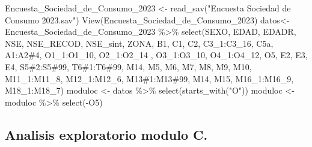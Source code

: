 \documentclass[
  letterpaper,
  DIV=11,
  numbers=noendperiod]{scrartcl}
\newenvironment{Shaded}{\begin{snugshade}}{\end{snugshade}}
\newcommand{\AttributeTok}[1]{\textcolor[rgb]{0.40,0.45,0.13}{#1}}
\newcommand{\FunctionTok}[1]{\textcolor[rgb]{0.28,0.35,0.67}{#1}}
\newcommand{\NormalTok}[1]{\textcolor[rgb]{0.00,0.23,0.31}{#1}}
\newcommand{\OtherTok}[1]{\textcolor[rgb]{0.00,0.23,0.31}{#1}}
\newcommand{\SpecialCharTok}[1]{\textcolor[rgb]{0.37,0.37,0.37}{#1}}
\newcommand{\StringTok}[1]{\textcolor[rgb]{0.13,0.47,0.30}{#1}}
\begin{document}
\begin{Shaded}
\begin{Highlighting}[]
\NormalTok{Encuesta\_Sociedad\_de\_Consumo\_2023 }\OtherTok{\textless{}{-}} \FunctionTok{read\_sav}\NormalTok{(}\StringTok{"Encuesta Sociedad de Consumo 2023.sav"}\NormalTok{)}
\FunctionTok{View}\NormalTok{(Encuesta\_Sociedad\_de\_Consumo\_2023)}
\NormalTok{datos}\OtherTok{\textless{}{-}}\NormalTok{ Encuesta\_Sociedad\_de\_Consumo\_2023 }\SpecialCharTok{\%\textgreater{}\%} \FunctionTok{select}\NormalTok{(SEXO, EDAD, EDADR, NSE, NSE\_RECOD, NSE\_sint, ZONA, B1, C1, C2, C3\_1}\SpecialCharTok{:}\NormalTok{C3\_16, C5a, A1}\SpecialCharTok{:}\StringTok{\textasciigrave{}}\AttributeTok{A2\#4}\StringTok{\textasciigrave{}}\NormalTok{, O1\_1}\SpecialCharTok{:}\NormalTok{O1\_10, O2\_1}\SpecialCharTok{:}\NormalTok{O2\_14 , O3\_1}\SpecialCharTok{:}\NormalTok{O3\_10, O4\_1}\SpecialCharTok{:}\NormalTok{O4\_12, O5, E2, E3, E4, }\StringTok{\textasciigrave{}}\AttributeTok{S5\#2}\StringTok{\textasciigrave{}}\SpecialCharTok{:}\StringTok{\textasciigrave{}}\AttributeTok{S5\#99}\StringTok{\textasciigrave{}}\NormalTok{, }\StringTok{\textasciigrave{}}\AttributeTok{T6\#1}\StringTok{\textasciigrave{}}\SpecialCharTok{:}\StringTok{\textasciigrave{}}\AttributeTok{T6\#99}\StringTok{\textasciigrave{}}\NormalTok{, M14, M5, M6, M7, M8, M9, M10, M11\_1}\SpecialCharTok{:}\NormalTok{M11\_8, M12\_1}\SpecialCharTok{:}\NormalTok{M12\_6, }\StringTok{\textasciigrave{}}\AttributeTok{M13\#1}\StringTok{\textasciigrave{}}\SpecialCharTok{:}\StringTok{\textasciigrave{}}\AttributeTok{M13\#99}\StringTok{\textasciigrave{}}\NormalTok{, M14, M15, M16\_1}\SpecialCharTok{:}\NormalTok{M16\_9, M18\_1}\SpecialCharTok{:}\NormalTok{M18\_7)}
\NormalTok{moduloc }\OtherTok{\textless{}{-}}\NormalTok{ datos }\SpecialCharTok{\%\textgreater{}\%} \FunctionTok{select}\NormalTok{(}\FunctionTok{starts\_with}\NormalTok{(}\StringTok{"O"}\NormalTok{))}
\NormalTok{moduloc }\OtherTok{\textless{}{-}}\NormalTok{ moduloc }\SpecialCharTok{\%\textgreater{}\%} \FunctionTok{select}\NormalTok{(}\SpecialCharTok{{-}}\NormalTok{O5)}
\end{Highlighting}
\end{Shaded}

\subsection{Analisis exploratorio modulo
C.}\label{analisis-exploratorio-modulo-c.}
\end{document}
